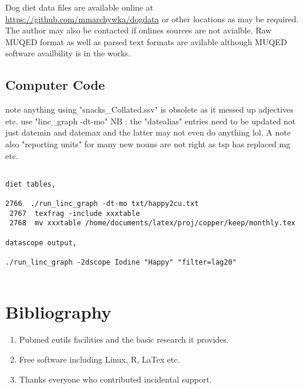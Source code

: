 Dog diet data files are available online at
{\url{https://github.com/mmarchywka/dogdata}}
or other locations as may be required.
The author may also be contacted if onlines sources are not
avialble. Raw MUQED format as well as parsed text formats
are avilable although MUQED software availbility is in the works.


\subsection{Computer Code}
note anything using "snacks\_Collated.ssv" is obsolete as it messed
up adjectives etc. use "linc\_graph -dt-mo"
NB : the "datealias" entries need to be updated not just datemin and datemax
and the latter may not even do anything lol.  A note also
"reporting units" for many new nouns are not right as tsp
 has replaced mg etc. 

\begin{lstlisting}

diet tables, 

2766  ./run_linc_graph -dt-mo txt/happy2cu.txt 
 2767  texfrag -include xxxtable 
 2768  mv xxxtable /home/documents/latex/proj/copper/keep/monthly.tex

datascope output, 

./run_linc_graph -2dscope Iodine "Happy" "filter=lag20"


\end{lstlisting}
\section{Bibliography}






\begin{acknowledgments} 

% 
\begin{enumerate}
\item Pubmed eutils facilities and the basic research it provides. 
\item Free software including Linux, R, LaTex  etc.
\item Thanks everyone who contributed incidental support. 
\end{enumerate}

\end{acknowledgments}

\clearpage
\appendix

